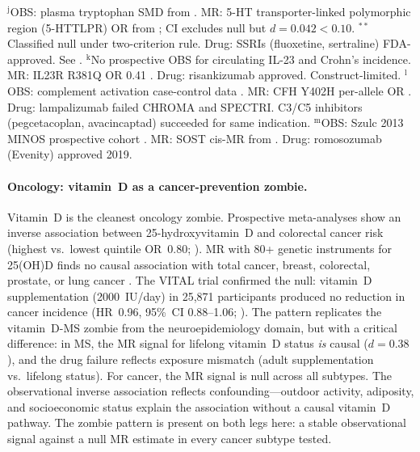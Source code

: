 \documentclass[11pt]{article}
\begin{document}
\begin{table}[t]
{$^\text{j}$OBS: plasma tryptophan SMD from \citet{ogawa2014}. MR: 5-HT transporter-linked polymorphic region (5-HTTLPR) OR from \citet{clarke2010serotonin}; CI excludes null but $d = 0.042 < 0.10$. $^{**}$Classified null under two-criterion rule. Drug: SSRIs (fluoxetine, sertraline) FDA-approved. See \citet{moncrieff2022}.
$^\text{k}$No prospective OBS for circulating IL-23 and Crohn's incidence. MR: IL23R R381Q OR 0.41 \cite{nie2015il23r}. Drug: risankizumab approved. Construct-limited.
$^\text{l}$OBS: complement activation case-control data \cite{reynolds2009}. MR: CFH Y402H per-allele OR \cite{thakkinstian2006}. Drug: lampalizumab failed CHROMA and SPECTRI. C3/C5 inhibitors (pegcetacoplan, avacincaptad) succeeded for same indication.
$^\text{m}$OBS: Szulc 2013 MINOS prospective cohort \cite{szulc2014}. MR: SOST cis-MR from \citet{bovijn2020}. Drug: romosozumab (Evenity) approved 2019.
}
\end{table}

\paragraph{Oncology: vitamin~D as a cancer-prevention zombie.}
Vitamin~D is the cleanest oncology zombie. Prospective meta-analyses show an inverse association between 25-hydroxyvitamin~D and colorectal cancer risk (highest vs.\ lowest quintile OR~0.80; \cite{keum2014vitdobscancer}). MR with 80+ genetic instruments for 25(OH)D finds no causal association with total cancer, breast, colorectal, prostate, or lung cancer \cite{ong2021vitdcancer}. The VITAL trial confirmed the null: vitamin~D supplementation (2000~IU/day) in 25,871 participants produced no reduction in cancer incidence (HR~0.96, 95\%~CI 0.88--1.06; \cite{manson2019vital}). The pattern replicates the vitamin~D-MS zombie from the neuroepidemiology domain, but with a critical difference: in MS, the MR signal for lifelong vitamin~D status \emph{is} causal ($d = 0.38$), and the drug failure reflects exposure mismatch (adult supplementation vs.\ lifelong status). For cancer, the MR signal is null across all subtypes. The observational inverse association reflects confounding---outdoor activity, adiposity, and socioeconomic status explain the association without a causal vitamin~D pathway. The zombie pattern is present on both legs here: a stable observational signal against a null MR estimate in every cancer subtype tested.
\end{document}
